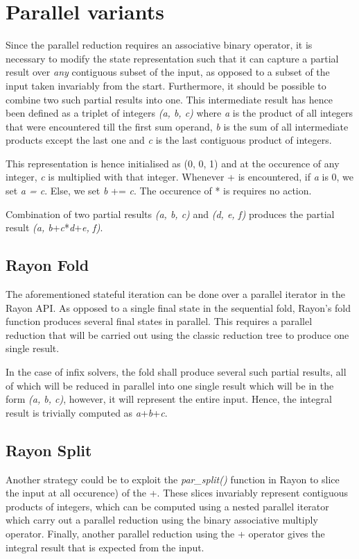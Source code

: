 \section{Parallel variants}
Since the parallel reduction requires an associative binary operator, it is necessary to modify the state representation such that it can capture a partial result over \emph{any} contiguous subset of the input, as opposed to a subset of the input taken invariably from the start. Furthermore, it should be possible to combine two such partial results into one. This intermediate result has hence been defined as a triplet of integers \emph{(a, b, c)} where \emph{a} is the product of all integers that were encountered till the first sum operand, \emph{b} is the sum of all intermediate products except the last one and \emph{c} is the last contiguous product of integers.

This representation is hence initialised as (0, 0, 1) and at the occurence of any integer, \emph{c} is multiplied with that integer. Whenever + is encountered, if \emph{a} is 0, we set \emph{a = c}. Else, we set \emph{b} += \emph{c}. The occurence of * is requires no action.

Combination of two partial results \emph{(a, b, c)} and \emph{(d, e, f)} produces the partial result \emph{(a, b}+\emph{c}*\emph{d}+\emph{e, f)}.

\subsection{Rayon Fold}
The aforementioned stateful iteration can be done over a parallel iterator in the Rayon API. As opposed to a single final state in the sequential fold, Rayon's fold function produces several final states in parallel. This requires a parallel reduction that will be carried out using the classic reduction tree to produce one single result.

In the case of infix solvers, the fold shall produce several such partial results, all of which will be reduced in parallel into one single result which will be in the form \emph{(a, b, c)}, however, it will represent the entire input. Hence, the integral result is trivially computed as \emph{a}+\emph{b}+\emph{c}.
\subsection{Rayon Split}
Another strategy could be to exploit the \emph{par\_split()} function in Rayon to slice the input at all occurence) of the +. These slices invariably represent contiguous products of integers, which can be computed using a nested parallel iterator which carry out a parallel reduction using the binary associative multiply operator. Finally, another parallel reduction using the + operator gives the integral result that is expected from the input.
